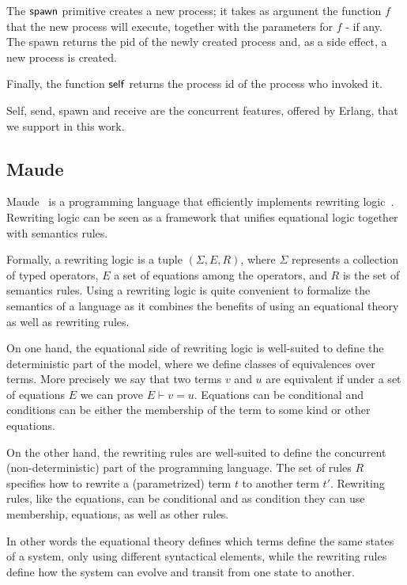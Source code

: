 \documentclass{article}[12pt,a4paper]
\theoremstyle{definition}
\begin{document}
The $\mathsf{spawn}$ primitive creates a new process; it takes as argument
the function $f$ that the new process will execute, together with the
parameters for $f$ - if any. The spawn returns the
pid of the newly created process and, as a side effect, a new process is created.

Finally, the function $\mathsf{self}$ returns the process id of the process
who invoked it.

Self, send, spawn and receive are the concurrent features, offered by Erlang, that we support in this work.

\subsection{Maude}

Maude~\cite{maude} is a programming language that efficiently implements rewriting logic~\cite{MeseguerMS96}.
Rewriting logic can be seen as a framework that unifies equational
logic together with semantics rules.

Formally, a rewriting logic is a tuple $(\Sigma, E, R)$, where $\Sigma$
represents a collection of typed operators, $E$ a set of equations among the operators, and $R$ is the set of
semantics rules. Using a rewriting logic is quite convenient to formalize the
semantics of a language as it combines the benefits of using an equational theory as well as rewriting rules.

On one hand, the equational side of rewriting logic is well-suited to define the deterministic part of the model, where
we define classes of equivalences over terms. More precisely we say that two terms
$v$ and $u$ are equivalent if under a set of equations $E$ we can prove $E \vdash
v = u$. Equations can be conditional and conditions can be either the
membership of the term to some kind or other equations.

On the other hand, the rewriting rules are well-suited to define the concurrent
(non-deterministic) part of the programming language. The set of rules $R$
specifies how to rewrite a (parametrized) term $t$ to another term $t'$.
Rewriting rules, like the equations, can be conditional and as condition they can
use membership, equations, as well as other rules.

In other words the equational theory defines which terms define the same states
of a system, only using different syntactical elements, while the rewriting rules
define how the system can evolve and transit from one state to another.
\end{document}
